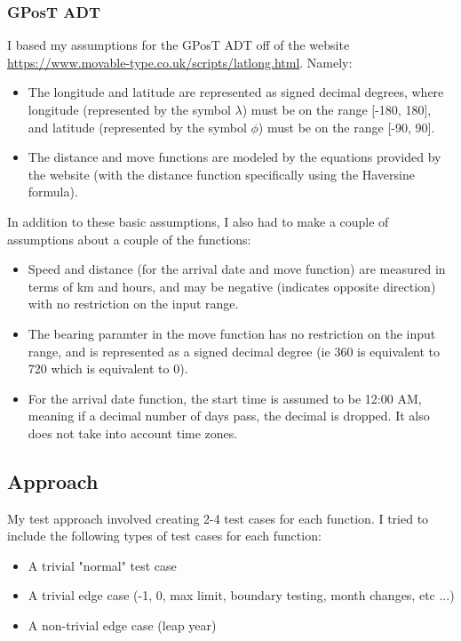 \documentclass[12pt]{article}
\begin{document}
\subsubsection{GPosT ADT}
I based my assumptions for the GPosT ADT off of the website \url{https://www.movable-type.co.uk/scripts/latlong.html}. Namely:
\begin{itemize}
  \item The longitude and latitude are represented as signed decimal degrees, where longitude (represented by the symbol $\lambda$) must be on the range [-180, 180], and latitude (represented by the symbol $\phi$) must be on the range [-90, 90].
  \item The distance and move functions are modeled by the equations provided by the website (with the distance function specifically using the Haversine formula).
\end{itemize} 

In addition to these basic assumptions, I also had to make a couple of assumptions about a couple of the functions:
\begin{itemize}
  \item Speed and distance (for the arrival date and move function) are measured in terms of km and hours, and may be negative (indicates opposite direction) with no restriction on the input range.
  \item The bearing paramter in the move function has no restriction on the input range, and is represented as a signed decimal degree (ie 360 is equivalent to 720 which is equivalent to 0).
  \item For the arrival date function, the start time is assumed to be 12:00 AM, meaning if a decimal number of days pass, the decimal is dropped. It also does not take into account time zones.
\end{itemize}

\subsection{Approach}
My test approach involved creating 2-4 test cases for each function. I tried to include the following types of test cases for each function:
\begin{itemize}
  \item A trivial "normal" test case
  \item A trivial edge case (-1, 0, max limit, boundary testing, month changes, etc ...)
  \item A non-trivial edge case (leap year)
\end{itemize}
\end{document}

